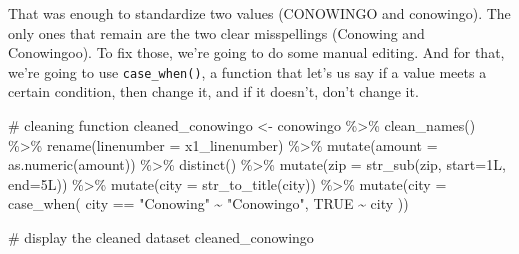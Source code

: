 \documentclass[
  letterpaper,
  DIV=11,
  numbers=noendperiod]{scrreprt}
\newenvironment{Shaded}{\begin{snugshade}}{\end{snugshade}}
\newcommand{\AttributeTok}[1]{\textcolor[rgb]{0.40,0.45,0.13}{#1}}
\newcommand{\CommentTok}[1]{\textcolor[rgb]{0.37,0.37,0.37}{#1}}
\newcommand{\ConstantTok}[1]{\textcolor[rgb]{0.56,0.35,0.01}{#1}}
\newcommand{\FunctionTok}[1]{\textcolor[rgb]{0.28,0.35,0.67}{#1}}
\newcommand{\NormalTok}[1]{\textcolor[rgb]{0.00,0.23,0.31}{#1}}
\newcommand{\OtherTok}[1]{\textcolor[rgb]{0.00,0.23,0.31}{#1}}
\newcommand{\SpecialCharTok}[1]{\textcolor[rgb]{0.37,0.37,0.37}{#1}}
\newcommand{\StringTok}[1]{\textcolor[rgb]{0.13,0.47,0.30}{#1}}
\begin{document}
That was enough to standardize two values (CONOWINGO and conowingo). The
only ones that remain are the two clear misspellings (Conowing and
Conowingoo). To fix those, we're going to do some manual editing. And
for that, we're going to use \texttt{case\_when()}, a function that
let's us say if a value meets a certain condition, then change it, and
if it doesn't, don't change it.

\begin{Shaded}
\begin{Highlighting}[]
\CommentTok{\# cleaning function}
\NormalTok{cleaned\_conowingo }\OtherTok{\textless{}{-}}\NormalTok{ conowingo }\SpecialCharTok{\%\textgreater{}\%}
  \FunctionTok{clean\_names}\NormalTok{() }\SpecialCharTok{\%\textgreater{}\%}
  \FunctionTok{rename}\NormalTok{(}\AttributeTok{linenumber =}\NormalTok{ x1\_linenumber) }\SpecialCharTok{\%\textgreater{}\%}
  \FunctionTok{mutate}\NormalTok{(}\AttributeTok{amount =} \FunctionTok{as.numeric}\NormalTok{(amount)) }\SpecialCharTok{\%\textgreater{}\%}
  \FunctionTok{distinct}\NormalTok{() }\SpecialCharTok{\%\textgreater{}\%}
  \FunctionTok{mutate}\NormalTok{(}\AttributeTok{zip =} \FunctionTok{str\_sub}\NormalTok{(zip, }\AttributeTok{start=}\NormalTok{1L, }\AttributeTok{end=}\NormalTok{5L)) }\SpecialCharTok{\%\textgreater{}\%}
  \FunctionTok{mutate}\NormalTok{(}\AttributeTok{city =} \FunctionTok{str\_to\_title}\NormalTok{(city)) }\SpecialCharTok{\%\textgreater{}\%}
  \FunctionTok{mutate}\NormalTok{(}\AttributeTok{city =} \FunctionTok{case\_when}\NormalTok{(}
\NormalTok{    city }\SpecialCharTok{==} \StringTok{"Conowing"} \SpecialCharTok{\textasciitilde{}} \StringTok{"Conowingo"}\NormalTok{,}
    \ConstantTok{TRUE} \SpecialCharTok{\textasciitilde{}}\NormalTok{ city}
\NormalTok{  ))}

\CommentTok{\# display the cleaned dataset}
\NormalTok{cleaned\_conowingo}
\end{Highlighting}
\end{Shaded}
\end{document}
